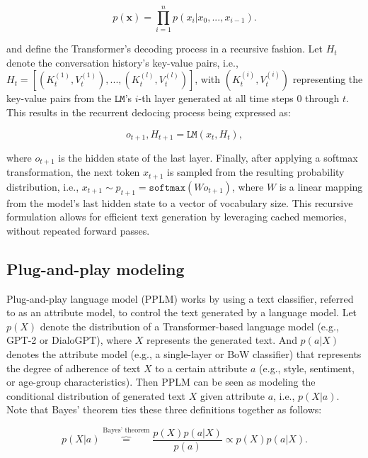 \begin{equation}
    p(\textbf{x}) = \prod_{i = 1}^n p(x_i | x_0, ..., x_{i - 1}).
\end{equation}

\cite{dathathri2019plug} and \cite{madotto-etal-2020-plug} define the Transformer's decoding process in a recursive fashion. Let $H_t$ denote the conversation history's key-value pairs, i.e., $H_t = \left[ (K_t^{(1)}, V_t^{(1)}), ..., (K_t^{(l)}, V_t^{(l)}) \right]$, with $(K_t^{(i)}, V_t^{(i)})$ representing the key-value pairs from the $\texttt{LM}$'s $i$-th layer generated at all time steps $0$ through $t$. This results in the recurrent dedocing process being expressed as:

\begin{equation}
    o_{t + 1}, H_{t + 1} = \texttt{LM} \left( x_t, H_t \right),
\end{equation}

where $o_{t + 1}$ is the hidden state of the last layer. Finally, after applying a softmax transformation, the next token $x_{t + 1}$ is sampled from the resulting probability distribution, i.e.,  $x_{t + 1} \sim p_{t + 1} = \texttt{softmax} \left( W o_{t + 1} \right)$, where $W$ is a linear mapping from the model's last hidden state to a vector of vocabulary size. This recursive formulation allows for efficient text generation by leveraging cached memories, without repeated forward passes.

\subsection{Plug-and-play modeling}
\label{sec:ppm}

Plug-and-play language model (PPLM) \cite{dathathri2019plug} works by using a text classifier, referred to as an attribute model, to control the text generated by a language model. Let $p(X)$ denote the distribution of a Transformer-based language model (e.g., GPT-2 or DialoGPT), where $X$ represents the generated text. And $p(a | X)$ denotes the attribute model (e.g., a single-layer or BoW classifier) that represents the degree of adherence of text $X$ to a certain attribute $a$ (e.g., style, sentiment, or age-group characteristics). Then PPLM can be seen as modeling the conditional distribution of generated text $X$ given attribute $a$, i.e., $p(X | a)$. Note that Bayes' theorem ties these three definitions together as follows:

\begin{equation}
    p(X | a) \overbrace{=}^{\text{Bayes' theorem}} 
    \frac{p(X) p(a | X)}{p(a)} \propto
    p(X)p(a | X).
\end{equation}

